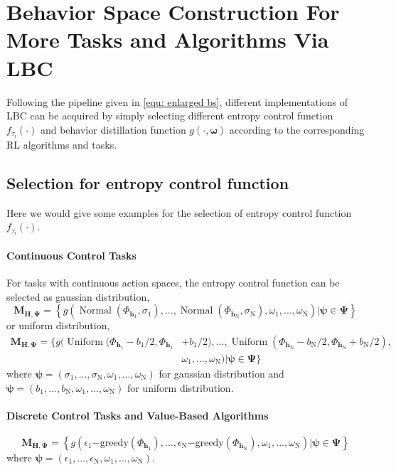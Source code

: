 \section{Behavior Space Construction For More Tasks and Algorithms Via LBC}
\label{Sec: appendix behavior space}
Following the pipeline given in \eqref{equ: enlarged bs}, different implementations of LBC can be acquired by simply selecting different entropy control function $f_{\tau_i}(\cdot)$ and behavior distillation function $g(\cdot, \bm{\omega})$ according to the corresponding RL algorithms and tasks. 

\subsection{Selection for entropy control function}
Here we would give some examples for the selection of entropy control function $f_{\tau_i}(\cdot)$.

\paragraph{Continuous Control Tasks} For tasks with continuous action spaces, the entropy control function can be selected as gaussian distribution, \ie
\begin{equation}
\mathbf{M}_{\mathbf{H},\bm{\Psi}} = \left\{ g\left( \operatorname{Normal}(\Phi_{\mathbf{h}_1},\sigma_1),...,\operatorname{Normal}(\Phi_{\mathbf{h}_{\mathrm{N}}},\sigma_{\mathrm{N}}),\omega_1,...,\omega_{\mathrm{N}} \right) | \bm{\psi}\in\bm{\Psi} \right\}
\end{equation}
or uniform distribution, \ie
\begin{equation}
\begin{aligned}
\mathbf{M}_{\mathbf{H},\bm{\Psi}} = \{ g( \operatorname{Uniform}(\Phi_{\mathbf{h}_1} - b_1 /2,\Phi_{\mathbf{h}_1} & + b_1 /2),...,\operatorname{Uniform}(\Phi_{\mathbf{h}_{\mathrm{N}}} - b_{\mathrm{N}}/2,\Phi_{\mathbf{h}_{\mathrm{N}}} + b_{\mathrm{N}}/2), \\
 & \omega_1,...,\omega_{\mathrm{N}} ) | \bm{\psi}\in\bm{\Psi} \}
\end{aligned}
\end{equation}
where $\bm{\psi}=(\sigma_1,...,\sigma_{\mathrm{N}},\omega_1,...,\omega_{\mathrm{N}})$ for gaussian distribution and $\bm{\psi}=(b_1,...,b_{\mathrm{N}},\omega_1,...,\omega_{\mathrm{N}})$ for uniform distribution.

\paragraph{Discrete Control Tasks and Value-Based Algorithms}
\begin{equation}
\mathbf{M}_{\mathbf{H},\bm{\Psi}} = \left\{ g\left( \epsilon_1\mathrm{-greedy}(\Phi_{\mathbf{h}_1}),...,\epsilon_{\mathrm{N}}\mathrm{-greedy}(\Phi_{\mathbf{h}_{\mathrm{N}}}),\omega_1,...,\omega_{\mathrm{N}} \right) | \bm{\psi}\in\bm{\Psi} \right\}
\end{equation}
where $\bm{\psi}=(\epsilon_1,...,\epsilon_{\mathrm{N}},\omega_1,...,\omega_{\mathrm{N}})$.

